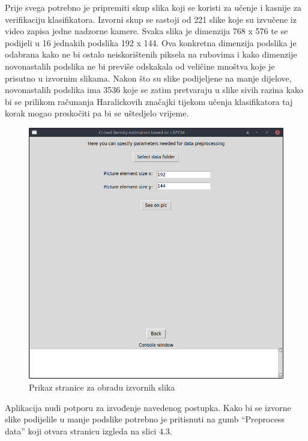 \documentclass[times, utf8, zavrsni]{fer}
\begin{document}
Prije svega potrebno je pripremiti skup slika koji se koristi za učenje i 
kasnije za verifikaciju klasifikatora. Izvorni skup se sastoji od 221 slike
koje su izvučene iz video zapisa jedne nadzorne kamere. Svaka slika je dimenzija
768 x 576 te se podijeli u 16 jednakih podslika 192 x 144. Ova konkretna dimenzija
podslika je odabrana kako ne bi ostalo neiskorištenih piksela na rubovima i 
kako dimenzije novonastalih podslika ne bi previše odskakala od veličine mnoštva
koje je prisutno u izvornim slikama. Nakon što su slike podijeljene na manje dijelove,
novonastalih podslika ima 3536 koje se zatim pretvaraju u slike sivih razina kako
bi se prilikom računanja Haralickovih značajki tijekom učenja klasifikatora taj
korak mogao preskočiti pa bi se uštedjelo vrijeme. 

\bigbreak

\begin{figure}[ht]
\centering
\includegraphics[scale=0.4]{img/preprocessdata.png}
\caption{Prikaz stranice za obradu izvornih slika}
\end{figure}

\bigbreak

Aplikacija nudi potporu za izvođenje navedenog postupka. Kako bi se izvorne
slike podijelile u manje podslike potrebno je pritisnuti na gumb \enquote{Preprocess data}
koji otvara stranicu izgleda na slici 4.3.
\end{document}

